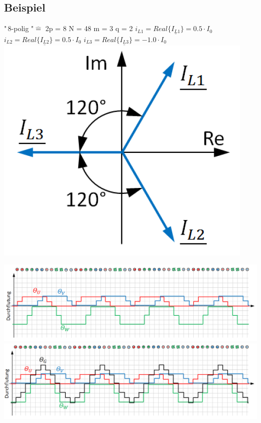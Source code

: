 \subsection{Beispiel}
\begin{minipage}[b]{0.4\linewidth}	
"\,8-polig "\quad$\widehat{=}$ \quad 2p = 8 \newline
N = 48 \newline
m = 3 \newline
q = 2 \newline \newline
$i_{L1} = Real\{\underline{I_{L1}}\} = 0.5\cdot I_0$ \newline \newline
$i_{L2} = Real\{\underline{I_{L2}}\} = 0.5\cdot I_0$ \newline \newline
$i_{L3} = Real\{\underline{I_{L3}}\} = -1.0\cdot I_0$ 
\newline \newline
	\includegraphics[scale = 0.4]{images/StromdreieckAGS}
\end{minipage}
\begin{minipage}[b]{0.4\linewidth}
	\raggedright
\includegraphics[scale = 0.35]{images/Durchflutung3} \newline
\includegraphics[scale = 0.35]{images/Durchflutung4} \newline

\end{minipage}
\clearpage